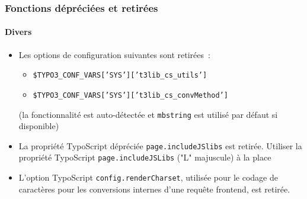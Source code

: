 \begin{frame}[fragile]
	\frametitle{Fonctions dépréciées et retirées}
	\framesubtitle{Divers}

	\begin{itemize}

		\item Les options de configuration suivantes sont retirées~:

			\begin{itemize}
				\item \texttt{\$TYPO3\_CONF\_VARS['SYS']['t3lib\_cs\_utils']}
				\item \texttt{\$TYPO3\_CONF\_VARS['SYS']['t3lib\_cs\_convMethod']}
			\end{itemize}

			\small
				(la fonctionnalité est auto-détectée et \texttt{mbstring} est
				utilisé par défaut si disponible)
			\normalsize

		\item La propriété TypoScript dépréciée \texttt{page.includeJSlibs} est retirée.
			Utiliser la propriété TypoScript \texttt{page.includeJSLibs}
			("L" majuscule) à la place

		\item L'option TypoScript \texttt{config.renderCharset}, utilisée pour le
			codage de caractères pour les conversions internes d'une requête frontend, est
			retirée.

	\end{itemize}

\end{frame}

